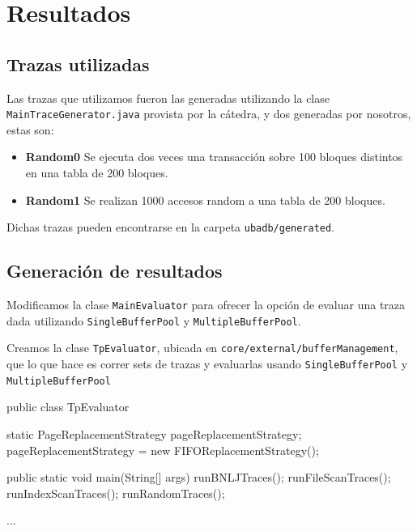 \section{Resultados}


\vspace*{0.3cm}

\subsection{Trazas utilizadas}

Las trazas que utilizamos fueron las generadas utilizando la
clase \texttt{MainTraceGenerator.java} provista por la cátedra,
y dos generadas por nosotros, estas son:

\begin{itemize}
    \item
            \textbf{Random0}
            Se ejecuta dos veces una transacci\'on sobre 100 bloques
            distintos en una tabla de 200 bloques.
            
    \item
            \textbf{Random1}
            Se realizan 1000 accesos random a una tabla de 200 bloques.

\end{itemize}

Dichas trazas pueden encontrarse en la carpeta 
\texttt{ubadb/generated}.


\subsection{Generación de resultados}

Modificamos la clase \texttt{MainEvaluator} para ofrecer la opción de
evaluar una traza dada utilizando \texttt{SingleBufferPool}
y \texttt{MultipleBufferPool}. 

\vspace*{0.5cm}

Creamos la clase \texttt{TpEvaluator}, ubicada en
\texttt{core/external/bufferManagement}, que lo que hace es
correr sets de trazas y evaluarlas usando \texttt{SingleBufferPool}
y \texttt{MultipleBufferPool}

\begin{verbatimtab}[4]
public class TpEvaluator 
{
	static PageReplacementStrategy pageReplacementStrategy;
	pageReplacementStrategy = new FIFOReplacementStrategy();

	public static void main(String[] args)
	{
		runBNLJTraces();
		runFileScanTraces();
		runIndexScanTraces();		
		runRandomTraces();
	}

	...
}
\end{verbatimtab}

